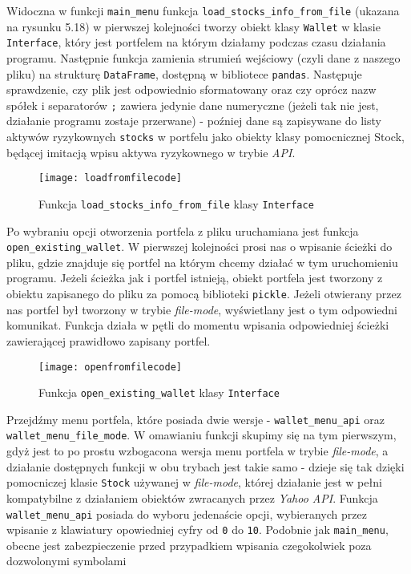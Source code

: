 \documentclass[magister]{dyplom}
\def\code#1{\texttt{#1}}
\begin{document}
Widoczna w funkcji \code{main\_menu} funkcja \code{load\_stocks\_info\_from\_file} (ukazana na rysunku 5.18) w pierwszej kolejności tworzy obiekt klasy \code{Wallet} w klasie \code{Interface}, który jest portfelem na którym działamy podczas czasu działania programu. Następnie funkcja zamienia strumień wejściowy (czyli dane z naszego pliku) na strukturę \code{DataFrame}, dostępną w bibliotece \code{pandas}. Następuje sprawdzenie, czy plik jest odpowiednio sformatowany oraz czy oprócz nazw spółek i separatorów \code{;} zawiera jedynie dane numeryczne (jeżeli tak nie jest, działanie programu zostaje przerwane) - poźniej dane są zapisywane do listy aktywów ryzykownych \code{stocks} w portfelu jako obiekty klasy pomocnicznej Stock, będącej imitacją wpisu aktywa ryzykownego w trybie \textit{API}.

\begin{figure}[ht]
	\centering
	\texttt{[image: loadfromfilecode]}
	\caption{Funkcja \code{load\_stocks\_info\_from\_file} klasy \code{Interface}}
\end{figure}

Po wybraniu opcji otworzenia portfela z pliku uruchamiana jest funkcja \code{open\_existing\_wallet}. W pierwszej kolejności prosi nas o wpisanie ścieżki do pliku, gdzie znajduje się portfel na którym chcemy działać w tym uruchomieniu programu. Jeżeli ścieżka jak i portfel istnieją, obiekt portfela jest tworzony z obiektu zapisanego do pliku za pomocą biblioteki \code{pickle}. Jeżeli otwierany przez nas portfel był tworzony w trybie \textit{file-mode}, wyświetlany jest o tym odpowiedni komunikat. Funkcja działa w pętli do momentu wpisania odpowiedniej ścieżki zawierającej prawidłowo zapisany portfel.

\begin{figure}[ht]
	\centering
	\texttt{[image: openfromfilecode]}
	\caption{Funkcja \code{open\_existing\_wallet} klasy \code{Interface}}
\end{figure}

Przejdźmy menu portfela, które posiada dwie wersje - \code{wallet\_menu\_api} oraz \newline
\code{wallet\_menu\_file\_mode}. W omawianiu funkcji skupimy się na tym pierwszym, gdyż jest to po prostu wzbogacona wersja menu portfela w trybie \textit{file-mode}, a działanie dostępnych funkcji w obu trybach jest takie samo - dzieje się tak dzięki pomocniczej klasie \code{Stock} używanej w \textit{file-mode}, której działanie jest w pełni kompatybilne z działaniem obiektów zwracanych przez \textit{Yahoo API}.
Funkcja \code{wallet\_menu\_api} posiada do wyboru jedenaście opcji, wybieranych przez wpisanie z klawiatury opowiedniej cyfry od \code{0} do \code{10}. Podobnie jak \code{main\_menu}, obecne jest zabezpieczenie przed przypadkiem wpisania czegokolwiek poza dozwolonymi symbolami
\end{document}
